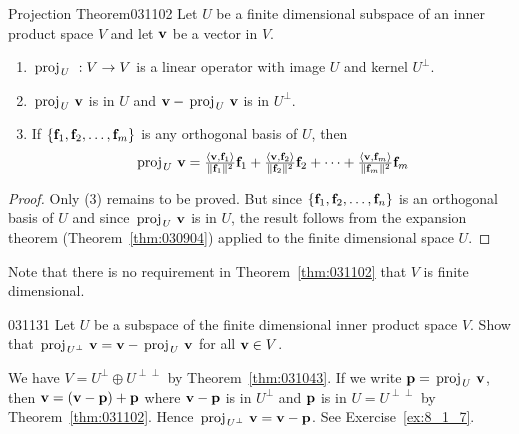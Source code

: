 \begin{theorem}{Projection Theorem}{031102}
Let $U$ be a finite dimensional subspace of an inner product space $V$ and let $\textbf{v}$ be a vector in $V$.

\begin{enumerate}
\item $\thinspace\operatorname{proj\medspace}_{\!U}\,{} : V \to V$ is a linear operator with image $U$ and kernel $U^{\perp}$.

\item $\thinspace\operatorname{proj\medspace}_{\!U}\,{\textbf{v}}$ is in $U$ and $\textbf{v} - \thinspace\operatorname{proj\medspace}_{\!U}\,{\textbf{v}}$ is in $U^{\perp}$.

\item If $\{\textbf{f}_{1}, \textbf{f}_{2}, \dots, \textbf{f}_{m}\}$ is any orthogonal basis of $U$, then
\begin{equation*}
\thinspace\operatorname{proj\medspace}_{\!U}\,{\textbf{v}} = 
\tfrac{\langle \textbf{v}, \textbf{f}_1 \rangle}{\| \textbf{f}_1 \| ^2} \textbf{f}_1 +
\tfrac{\langle \textbf{v}, \textbf{f}_2 \rangle}{\| \textbf{f}_2 \| ^2} \textbf{f}_2 + \dots +
\tfrac{\langle \textbf{v}, \textbf{f}_m \rangle}{\| \textbf{f}_m \| ^2} \textbf{f}_m
\end{equation*}
\end{enumerate}
\end{theorem}

\begin{proof}
Only (3) remains to be proved. But since $\{\textbf{f}_{1}, \textbf{f}_{2}, \dots, \textbf{f}_{n}\}$ is an orthogonal basis of $U$ and since $\thinspace\operatorname{proj\medspace}_{\!U}\,{\textbf{v}}$ is in $U$, the result follows from the expansion theorem (Theorem~\ref{thm:030904}) applied to the finite dimensional space $U$.
\end{proof}

Note that there is no requirement in Theorem~\ref{thm:031102} that $V$ is finite dimensional.

\begin{example}{}{031131}
Let $U$ be a subspace of the finite dimensional inner product space $V$. Show that $\thinspace\operatorname{proj\medspace}_{\!U^\perp}\,{\textbf{v}} = \textbf{v} - \thinspace\operatorname{proj\medspace}_{\!U}\,{\textbf{v}}$ for all $\textbf{v} \in V$.

\begin{solution}
We have $V = U^{\perp} \oplus U^{\perp\perp}$ by Theorem~\ref{thm:031043}. If we write $\textbf{p} = \thinspace\operatorname{proj\medspace}_{\!U}\,{\textbf{v}}$, then $\textbf{v} = (\textbf{v} - \textbf{p}) + \textbf{p}$ where $\textbf{v} - \textbf{p}$ is in $U^{\perp}$ and $\textbf{p}$ is in $U = U^{\perp\perp}$ by Theorem~\ref{thm:031102}. Hence $\thinspace\operatorname{proj\medspace}_{\!U^\perp}\,{\textbf{v}} = \textbf{v} - \textbf{p}$. See Exercise~\ref{ex:8_1_7}.
\end{solution}
\end{example}

